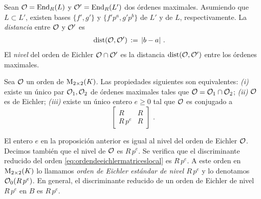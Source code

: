 Sean $\cal{O}=\Endo[R](L)$ y $\cal{O}'=\Endo[R](L')$ dos \'{o}rdenes maximales.
Asumiendo que $L\subset L'$, existen bases $\{f',g'\}$ y $\{f'p^{a},g'p^{b}\}$
de $L'$ y de $L$, respectivamente. La \emph{distancia} entre $\cal{O}$ y
$\cal{O}'$ es
\begin{align*}
	\mathrm{dist}(\cal{O},\cal{O}') & \,:=\, |b-a|
	\text{ .}
\end{align*}
%
El \emph{nivel} del orden de Eichler $\cal{O}\cap\cal{O}'$ es la distancia
$\mathrm{dist}(\cal{O},\cal{O}')$ entre los \'{o}rdenes maximales.

\begin{propoOrdenDeEichlerMatrices}\label{propo:ordendeeichlermatrices}
	Sea $\cal{O}$ un orden de $\MM_{2\times 2}(K)$. Las propiedades
	siguientes son equivalentes: \textit{(i)} existe un \'{u}nico par
	$\cal{O}_{1},\cal{O}_{2}$ de \'{o}rdenes maximales tales que
	$\cal{O}=\cal{O}_{1}\cap\cal{O}_{2}$; \textit{(ii)} $\cal{O}$ es de
	Eichler; \textit{(iii)} existe un \'{u}nico entero $e\geq 0$ tal que
	$\cal{O}$ es conjugado a
	\begin{equation}
		\label{eq:ordendeeichlermatriceslocal}
		\begin{bmatrix} R & R \\ R\,p^{e} & R \end{bmatrix}
		\text{ .}
	\end{equation}
\end{propoOrdenDeEichlerMatrices}

El entero $e$ en la proposici\'{o}n anterior es igual al nivel del orden de
Eichler $\cal{O}$. Decimos tambi\'{e}n que el nivel de $\cal{O}$ es $R\,p^e$.
Se verifica que el discriminante reducido del orden
\eqref{eq:ordendeeichlermatriceslocal} es $R\,p^e$. A este orden en
$\MM_{2\times 2}(K)$ lo llamamos \emph{orden de Eichler est\'{a}ndar de nivel %
$R\,p^e$}
y lo denotamos $\cal{O}_{0}(R\,p^e)$. En general, el discriminante reducido de
un orden de Eichler de nivel $R\,p^e$ en $B$ es $R\,p^e$.

